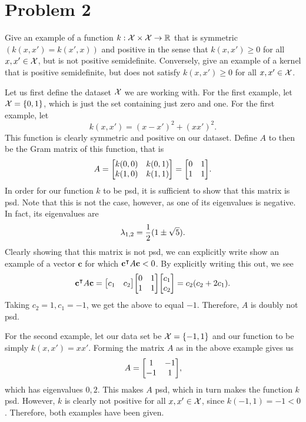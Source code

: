 \newpage
\section{Problem 2}
Give an example of a function $k: \mathcal{X} \times \mathcal{X} \to \mathbb{R}$ that is symmetric $(k(x, x') = k(x', x))$ and positive in the sense that $k(x, x') \geq 0$ for all $x, x' \in \mathcal{X}$, but is not positive semidefinite. Conversely, give an example of a kernel that is positive semidefinite, but does not satisfy $k(x, x') \geq 0$ for all $x, x' \in \mathcal{X}$.
\partbreak
\begin{solution}

    Let us first define the dataset $\mathcal{X}$ we are working with. For the first example, let $\mathcal{X} = \{0, 1\}$, which is just the set containing just zero and one. For the first example, let 
    \[k(x, x') = (x - x')^2 + (xx')^2.\]
    This function is clearly symmetric and positive on our dataset. Define $A$ to then be the Gram matrix of this function, that is
    \[A = \mqty[k(0, 0)&k(0, 1)\\k(1, 0)&k(1, 1)] = \mqty[0&1\\1&1].\]
    In order for our function $k$ to be psd, it is sufficient to show that this matrix is psd. Note that this is not the case, however, as one of its eigenvalues is negative. In fact, its eigenvalues are 
    \[\mathrm{\lambda}_{1, 2} = \frac{1}{2}(1 \pm \sqrt{5}).\]
    Clearly showing that this matrix is not psd, we can explicitly write show an example of a vector $\textbf{c}$ for which $\textbf{c}^{\intercal} A\textbf{c} < 0$. By explicitly writing this out, we see
    \[\textbf{c}\T A\textbf{c} = \mqty[c_1&c_2]\mqty[0&1\\1&1]\mqty[c_1\\c_2] = c_2(c_2 + 2c_1).\]
    Taking $c_2 = 1, c_1 = -1$, we get the above to equal $-1$. Therefore, $A$ is doubly not psd. \par

    For the second example, let our data set be $\mathcal{X} = \{-1, 1\}$ and our function to be simply $k(x, x') = xx'$. Forming the matrix $A$ as in the above example gives us
    \[A = \mqty[1&-1\\-1&1],\]
    which has eigenvalues $0, 2$. This makes $A$ psd, which in turn makes the function $k$ psd. However, $k$ is clearly not positive for all $x, x' \in \mathcal{X}$, since $k(-1, 1) = -1 < 0$. Therefore, both examples have been given.
\end{solution}

\newpage
